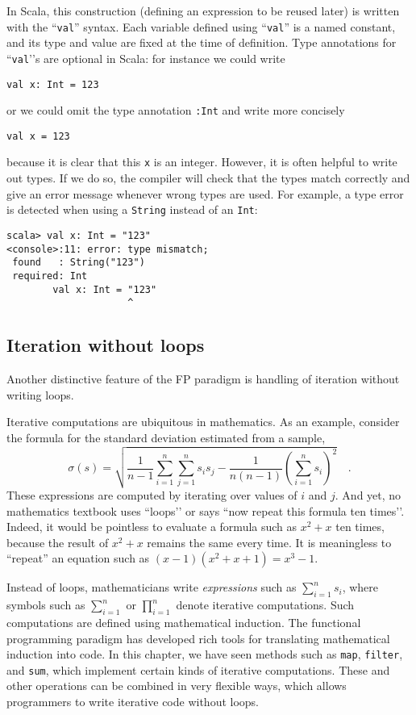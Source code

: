 In Scala, this construction (defining an expression to be reused later)
is written with the \textsf{``}\lstinline!val!\textsf{''} syntax. Each variable defined
using \textsf{``}\lstinline!val!\textsf{''} is a named constant, and its type and
value are fixed at the time of definition. Type annotations for \textsf{``}\lstinline!val!'\textsf{'}s
are optional in Scala: for instance we could write 
\begin{lstlisting}
val x: Int = 123
\end{lstlisting}
or we could omit the type annotation \lstinline!:Int! and write more
concisely
\begin{lstlisting}
val x = 123
\end{lstlisting}
because it is clear that this \texttt{}\lstinline!x! is an integer.
However, it is often helpful to write out types. If we do so, the
compiler will check that the types match correctly and give an error
message whenever wrong types are used. For example, a type error is
detected when using a \lstinline!String! instead of an \lstinline!Int!:
\begin{lstlisting}
scala> val x: Int = "123"
<console>:11: error: type mismatch;
 found   : String("123")
 required: Int
        val x: Int = "123"
                     ^
\end{lstlisting}


\subsection{Iteration without loops}

Another distinctive feature of the FP paradigm is handling of iteration
without writing loops.

Iterative computations are ubiquitous in mathematics. As an example,
consider the formula for the standard deviation estimated from a sample,
\[
\sigma(s)=\sqrt{\frac{1}{n-1}\sum_{i=1}^{n}\sum_{j=1}^{n}s_{i}s_{j}-\frac{1}{n\left(n-1\right)}\left(\sum_{i=1}^{n}s_{i}\right)^{2}}\quad.
\]
These expressions are computed by iterating over values of $i$ and
$j$. And yet, no mathematics textbook uses \textsf{``}loops\textsf{'}' or says \textsf{``}now
repeat this formula ten times\textsf{'}'. Indeed, it would be pointless to
evaluate a formula such as $x^{2}+x$ ten times, because the result
of $x^{2}+x$ remains the same every time. It is meaningless to \textsf{``}repeat\textsf{''}
an equation such as $\left(x-1\right)(x^{2}+x+1)=x^{3}-1$.

Instead of loops, mathematicians write \emph{expressions} such as
$\sum_{i=1}^{n}s_{i}$, where symbols such as $\sum_{i=1}^{n}$ or
$\prod_{i=1}^{n}$ denote iterative computations. Such computations
are defined using mathematical induction.
The functional programming paradigm has developed rich tools for translating
mathematical induction into code. In this chapter, we have seen methods
such as \lstinline!map!, \lstinline!filter!, and \lstinline!sum!,
which implement certain kinds of iterative computations. These and
other operations can be combined in very flexible ways, which allows
programmers to write iterative code without loops.

